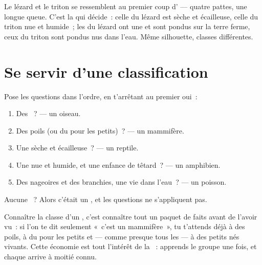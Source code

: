 \begin{remark}\label{rem:g4:classifying-animals:confusion}
Le lézard et le triton se ressemblent au premier coup d' ---
quatre pattes, une longue queue. C'est la  qui décide~: celle du
lézard est sèche et écailleuse, celle du triton nue et humide~; les
 du lézard ont une  et sont pondus sur la terre ferme,
ceux du triton sont pondus nus dans l'eau. Même silhouette, classes
différentes.
\end{remark}

\section{Se servir d'une classification}

\begin{method}\label{met:g4:classifying-animals:place}
Pose les questions dans l'ordre, en t'arrêtant au premier oui~:
\begin{enumerate}
  \item Des ~? --- un oiseau.
  \item Des poils (ou du  pour les petits)~? --- un mammifère.
  \item Une  sèche et écailleuse~? --- un reptile.
  \item Une  nue et humide, et une enfance de têtard~? --- un
        amphibien.
  \item Des nageoires et des branchies, une vie dans l'eau~? --- un
        poisson.
\end{enumerate}
Aucune ~? Alors c'était un , et les
questions ne s'appliquent pas.
\end{method}

\begin{proposition}\label{prop:g4:classifying-animals:free}
Connaître la classe d'un , c'est connaître tout un paquet de
faits avant de l'avoir vu~: si l'on te dit seulement «~c'est un
mammifère~», tu t'attends déjà à des poils, à du  pour les
petits et --- comme presque tous les  --- à des petits nés
vivants. Cette économie est tout l'intérêt de la ~:
apprends le groupe une fois, et chaque  arrive à moitié connu.
\end{proposition}
\admitted

